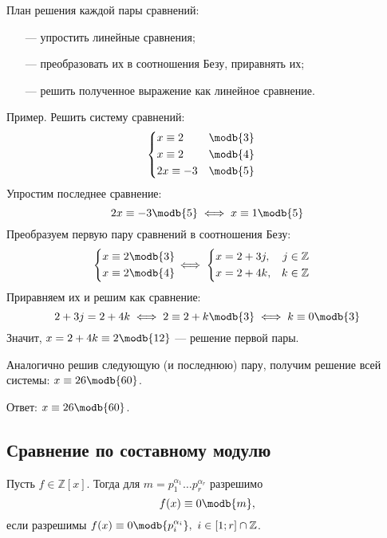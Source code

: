 План решения каждой пары сравнений:
\begin{itemize}
\item[---]упростить линейные сравнения;
\item[---]преобразовать их в соотношения Безу, приравнять их;
\item[---]решить полученное выражение как линейное сравнение.
\end{itemize}
{\bold Пример.} Решить систему сравнений:
$$\begin{cases}
\begin{aligned}
&x\equiv 2 &\modb{3}\\
&x\equiv 2 &\modb{4}\\
&2x\equiv -3 &\modb{5}
\end{aligned}
\end{cases}$$
Упростим последнее сравнение:
$$2x\equiv -3\modb{5}\iff x\equiv 1\modb{5}$$
Преобразуем первую пару сравнений в соотношения Безу:
$$\begin{cases}
\begin{aligned}
x\equiv 2 &\modb{3}\\
x\equiv 2 &\modb{4}
\end{aligned}
\end{cases}
\hspace*{-12pt}\iff
\begin{cases}
\begin{aligned}
x&=2+3j,& j&\in\mathbb{Z}\\
x&=2+4k,& k&\in\mathbb{Z}
\end{aligned}
\end{cases}$$
Приравняем их и решим как сравнение:
$$2+3j=2+4k\iff 2\equiv 2+k\modb{3}\iff k\equiv 0\modb{3}$$
Значит, $x=2+4k\equiv 2\modb{12}$ --- решение первой пары.

Аналогично решив следующую {\ital\color{desc} (и последнюю)} пару, получим решение всей системы: $x\equiv 26\modb{60}$.

{\ital Ответ:} $x\equiv 26\modb{60}$.

\subsection{Сравнение по составному модулю}

Пусть $f\in\mathbb{Z}[x]$. Тогда для $m=p_1^{\alpha_1}\dots p_r^{\alpha_r}$ разрешимо
$$f(x)\equiv 0\modb{m},$$
если разрешимы $f(x)\equiv 0\modb{p_i^{\alpha_i}},\ i\in[1;r]\cap\mathbb{Z}$.

